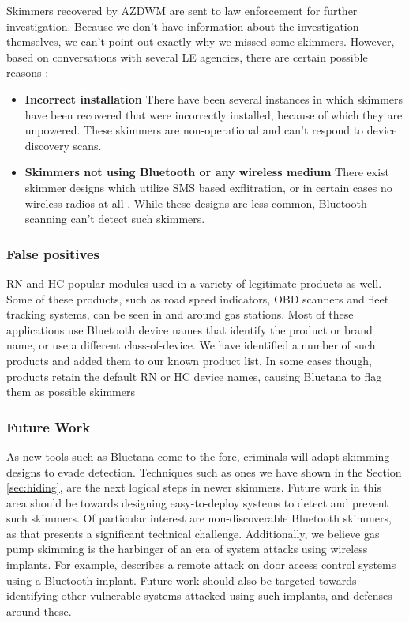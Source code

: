 Skimmers recovered by AZDWM are sent to law enforcement for further investigation. Because we don't have information about the investigation themselves, we can't point out exactly why we missed some skimmers. However, based on conversations with several LE agencies, there are certain possible reasons :
\begin{itemize}
	\item \textbf{Incorrect installation} There have been several instances in which skimmers have been recovered that were incorrectly installed, because of which they are unpowered. These skimmers are non-operational and can't respond to device discovery scans.
	\item \textbf{Skimmers not using Bluetooth or any wireless medium} There exist skimmer designs which utilize SMS based exflitration, or in certain cases no wireless radios at all \cite{scaifeoakland}\cite{skimreaper2018}. While these designs are less common, Bluetooth scanning can't detect such skimmers.
\end{itemize}

\subsubsection*{False positives}
\label{sec:falsepositive}

RN and HC popular modules used in a variety of legitimate products as well. Some of these products, such as road speed indicators, OBD scanners and fleet tracking systems, can be seen in and around gas stations. Most of these applications use Bluetooth device names that identify the product or brand name, or use a different class-of-device. We have identified a number of such products and added them to our known product list. In some cases though, products retain the default RN or HC device names, causing Bluetana to flag them as possible skimmers \cite{rnbteletrac}\cite{rnbtweathersensor}\cite{rnbtscale}

\subsubsection*{Future Work}
\label{sec:futurework}

As new tools such as Bluetana come to the fore, criminals will adapt skimming designs to evade detection. Techniques such as ones we have shown in the Section \ref{sec:hiding}, are the next logical steps in newer skimmers. Future work in this area should be towards designing easy-to-deploy systems to detect and prevent such skimmers. Of particular interest are non-discoverable Bluetooth skimmers, as that presents a significant technical challenge. Additionally, we believe gas pump skimming is the harbinger of an era of system attacks using wireless implants. For example, \cite{blekey} describes a remote attack on door access control systems using a Bluetooth implant. Future work should also be targeted towards identifying other vulnerable systems attacked using such implants, and defenses around these.

